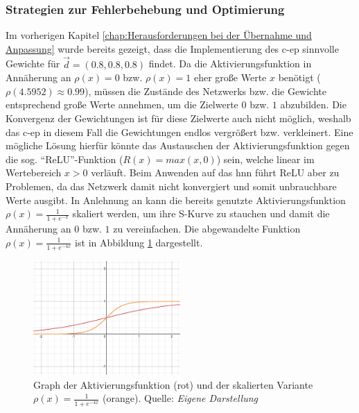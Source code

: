 \subsubsection{Strategien zur Fehlerbehebung und Optimierung}
\label{chap:Strategien zur Fehlerbehebung und Optimierung}

Im vorherigen Kapitel \ref{chap:Herausforderungen bei der Übernahme und Anpassung} wurde bereits gezeigt, dass die Implementierung des \ac{c-ep} sinnvolle Gewichte für \(\vec{d}=(0.8,0.8,0.8)\) findet. Da die Aktivierungsfunktion in Annäherung an \(\rho(x)=0\) bzw. \(\rho(x)=1\) eher große Werte \(x\) benötigt (\(\rho(4.5952)\approx0.99\)), müssen die Zustände des Netzwerks bzw. die Gewichte entsprechend große Werte annehmen, um die Zielwerte \(0\) bzw. \(1\) abzubilden. Die Konvergenz der Gewichtungen ist für diese Zielwerte auch nicht möglich, weshalb das \ac{c-ep} in diesem Fall die Gewichtungen endlos vergrößert bzw. verkleinert. Eine mögliche Lösung hierfür könnte das Austauschen der Aktivierungsfunktion gegen die sog. "`ReLU"'-Funktion (\(R(x)=max(x,0)\)) sein, welche linear im Wertebereich \(x>0\) verläuft. Beim Anwenden auf das \ac{hnn} führt ReLU aber zu Problemen, da das Netzwerk damit nicht konvergiert und somit unbrauchbare Werte ausgibt. In Anlehnung an \cite[vgl. S. 31]{Ernoult2020} kann die bereits genutzte Aktivierungsfunktion \(\rho(x)=\frac{1}{1+e^{-x}}\) skaliert werden, um ihre S-Kurve zu stauchen und damit die Annäherung an \(0\) bzw. \(1\) zu vereinfachen. Die abgewandelte Funktion \(\rho(x)=\frac{1}{1+e^{-4x}}\) ist in Abbildung \ref{fig:Graph der skalierten Aktivierungsfunktion} dargestellt.

\begin{figure}[h]
  \includegraphics[width=0.5\textwidth]{abbildungen/sigmoid_funktion_skaliert.png}
  \caption{Graph der Aktivierungsfunktion (rot) und der skalierten Variante \(\rho(x)=\frac{1}{1+e^{-4x}}\) (orange). Quelle: \textit{Eigene Darstellung}}
  \label{fig:Graph der skalierten Aktivierungsfunktion}
\end{figure}

